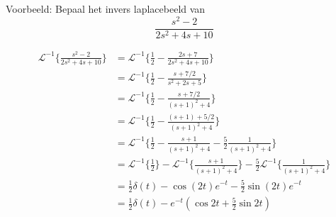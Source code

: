 \documentclass[12pt]{report}
\newcommand{\example}[2]{
    \hrulefill
    
    Voorbeeld: #1
    
    #2
    
    \hrulefill
}
\begin{document}
\example{Bepaal het invers laplacebeeld van
    $$\frac{s^2 - 2}{2s^2 + 4s + 10}$$
}{
    \begin{equation*}
     \begin{split}
      \mathcal{L}^{-1}\{\frac{s^2 - 2}{2s^2 + 4s + 10}\} & = \mathcal{L}^{-1}\bigg\{\frac{1}{2} - \frac{2s + 7}{2s^2 + 4s + 10}\bigg\}   \\
                                                    & = \mathcal{L}^{-1}\bigg\{\frac{1}{2} - \frac{s + 7/2}{s^2 + 2s + 5}\bigg\}    \\
                                                    & = \mathcal{L}^{-1}\bigg\{\frac{1}{2} - \frac{s + 7/2}{(s+1)^2 + 4}\bigg\}  \\
                                                    & = \mathcal{L}^{-1}\bigg\{\frac{1}{2} - \frac{(s + 1) + 5/2}{(s+1)^2 + 4}\bigg\}  \\
                                                    & = \mathcal{L}^{-1}\bigg\{\frac{1}{2} - \frac{s + 1}{(s+1)^2 + 4} - \frac{5}{2}\frac{1}{(s+1)^2 + 4}\bigg\}  \\
                                                    & = \mathcal{L}^{-1}\bigg\{\frac{1}{2}\bigg\} - \mathcal{L}^{-1}\bigg\{\frac{s + 1}{(s+1)^2 + 4}\bigg\} - \frac{5}{2}\mathcal{L}^{-1}\bigg\{\frac{1}{(s+1)^2 + 4}\bigg\}  \\
                                                    & = \frac{1}{2}\delta(t) - \cos(2t)e^{-t} - \frac{5}{2}\sin(2t)e^{-t} \\
                                                    & = \frac{1}{2}\delta(t) - e^{-t}(\cos 2t + \frac{5}{2}\sin 2t)
     \end{split}
    \end{equation*}

}
\end{document}
